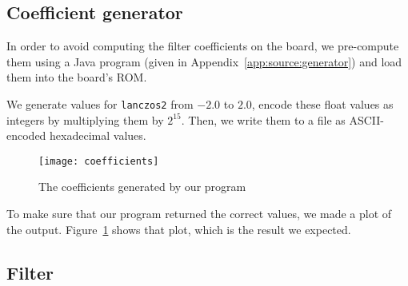 
\subsection{Coefficient generator}
In order to avoid computing the filter coefficients on the board, we pre-compute them using a Java program (given in Appendix~\ref{app:source:generator}) and load them into the board's ROM.

We generate values for \texttt{lanczos2} from $-2.0$ to $2.0$, encode these float values as integers by multiplying them by $2^15$.
Then, we write them to a file as ASCII-encoded hexadecimal values.

\begin{figure}
	\centering
	\texttt{[image: coefficients]}
	\caption{The coefficients generated by our program}
	\label{fig:coefficients}
\end{figure}

To make sure that our program returned the correct values, we made a plot of the output.
Figure~\ref{fig:coefficients} shows that plot, which is the result we expected.

\subsection{Filter}
